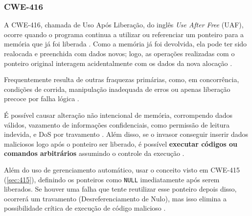 \documentclass[
    12pt,                %
    openright,           %
    oneside,             %
    a4paper,             %
    english,             %
    brazil               %
]{abntex2}
\begin{document}
\subsubsection{CWE-416}
\label{sec:416}
\par
A CWE-416, chamada de Uso Após Liberação, do inglês \textit{Use After Free} (UAF), ocorre quando o programa continua a utilizar ou referenciar um ponteiro para a memória que já foi liberada \cite{cwe416}.
Como a memória já foi devolvida, ela pode ter sido realocada e preenchida com dados novos; logo, as operações realizadas com o ponteiro original interagem acidentalmente com os dados da nova alocação \cite{cwe416}.
\par 
Frequentemente resulta de outras fraquezas primárias, como, em concorrência, condições de corrida, manipulação inadequada de erros ou apenas liberação precoce por falha lógica \cite{cwe416}.
\par 
É possível causar alteração não intencional de memória, corrompendo dados válidos, vazamento de informações confidenciais, como permissão de leitura indevida, e DoS por travamento \cite{cwe416}.
Além disso, se o invasor conseguir inserir dados maliciosos logo após o ponteiro ser liberado, é possível \textbf{executar códigos ou comandos arbitrários} assumindo o controle da execução \cite{cwe416}.
\par
Além do uso de gerenciamento automático, usar o conceito visto em CWE-415 (\ref{sec:415}), definindo os ponteiros como \texttt{NULL} imediatamente após serem liberados.
Se houver uma falha que tente reutilizar esse ponteiro depois disso, ocorrerá um travamento (Desreferenciamento de Nulo), mas isso elimina a possibilidade crítica de execução de código malicioso \cite{cwe415}.
\end{document}
